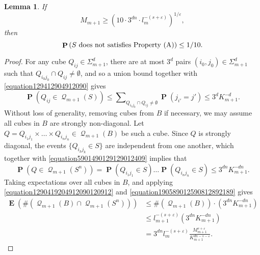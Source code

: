 \documentclass[12pt,reqno]{article}
\newtheorem{lemma}[theorem]{Lemma}
\DeclareMathOperator{\EE}{\mathbf{E}}
\DeclareMathOperator{\PP}{\mathbf{P}}
\DeclareMathOperator{\DQ}{\mathcal{Q}}
\begin{document}
\begin{lemma} \label{propertyALemma}
    If
    \begin{equation} \label{equation194012904129009}
        M_{m+1} \geq \left( 10 \cdot 3^{dn} \cdot l_m^{-(s + \varepsilon)} \right)^{1/\varepsilon},
    \end{equation}
    then
    \[ \PP \left(S\ \text{\normalfont{does not satisfies Property (A)}} \right) \leq 1/10. \]
\end{lemma}
\begin{proof}
    For any cube $Q_{ij} \in \Sigma_{m+1}^d$, there are at most $3^d$ pairs $(i_0,j_0) \in \Sigma_{m+1}^d$ such that $Q_{i_0j_0} \cap Q_{ij} \neq \emptyset$, and so a union bound together with \eqref{equation129412904912090} gives
    \begin{equation} \label{equation5901490129129012409}
        \PP(Q_{ij} \in \DQ_{m+1}(S)) \leq \sum\nolimits_{Q_{i_0j_0} \cap Q_{ij} \neq \emptyset} \PP(j_{i'} = j') \leq 3^d K_{m+1}^{-d}.
    \end{equation}
    Without loss of generality, removing cubes from $B$ if necessary, we may assume all cubes in $B$ are strongly non-diagonal. Let $Q = Q_{i_1j_1} \times \dots \times Q_{i_nj_n} \in \DQ_{m+1}(B)$ be such a cube. Since $Q$ is strongly diagonal, the events $\{ Q_{i_kj_k} \in S \}$ are independent from one another, which together with \eqref{equation5901490129129012409} implies that
    \begin{equation} \label{equation190589012590812892189}
       \PP(Q \in \DQ_{m+1}(S^n)) = \PP(Q_{i_1j_1} \in S) \dots \PP(Q_{i_nj_n} \in S) \leq 3^{dn} K_{m+1}^{-dn}.
    \end{equation}
    Taking expectations over all cubes in $B$, and applying \eqref{equation1290419204912090120912} and \eqref{equation190589012590812892189} gives
    \begin{equation} \label{equation129041289589128921891289}
    \begin{split}
        \EE(\#(\DQ_{m+1}(B) \cap \DQ_{m+1}(S^n))) &\leq \#(\DQ_{m+1}(B)) \cdot (3^{dn} K_{m+1}^{-dn})\\
        &\leq l_{m+1}^{-(s + \varepsilon)} (3^{dn} K_{m+1}^{- dn})\\
        &= 3^{dn} l_m^{-(s + \varepsilon)} \frac{M_{m+1}^{s + \varepsilon}}{K_{m+1}^{dn - s - \varepsilon}}.
    \end{split}
    \end{equation}

\end{proof}
\end{document}
